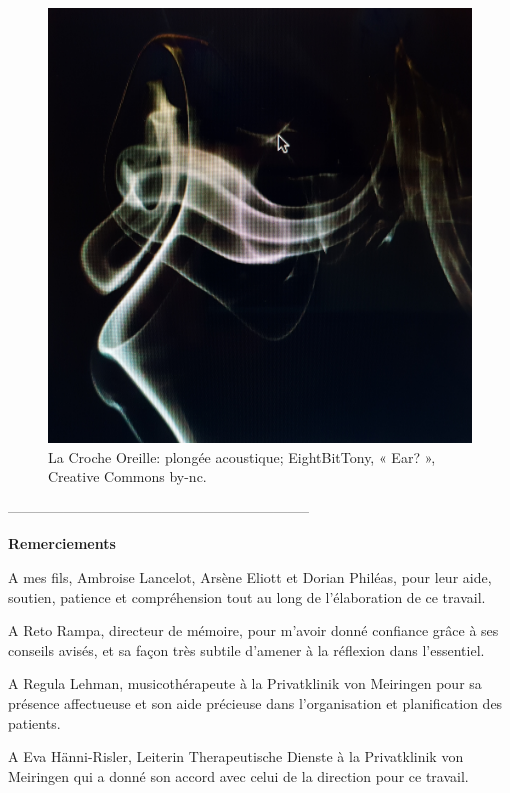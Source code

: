       \begin{figure}[tbh]
        \centering
        \includegraphics[width=1\linewidth]{images/oreillephoto.jpg}
        \caption{La Croche Oreille: plongée acoustique; EightBitTony, « Ear? », Creative Commons by-nc.}
        \label{fig}
      \end{figure}


-----------------------------------------------------------------







\textbf{Remerciements}


A mes fils, Ambroise Lancelot, Arsène Eliott et Dorian Philéas, pour leur aide, soutien, patience et compréhension tout au long de l'élaboration de ce travail.

A Reto Rampa, directeur de mémoire,
pour m'avoir donné confiance grâce à ses conseils
avisés, et sa façon très subtile d'amener à la réflexion dans l'essentiel.

A Regula Lehman, musicothérapeute à la Privatklinik von Meiringen pour sa présence affectueuse et son aide précieuse dans l'organisation et planification des patients.

A Eva Hänni-Risler, Leiterin Therapeutische Dienste à la Privatklinik von Meiringen qui a donné son accord avec celui de la direction pour ce travail.

